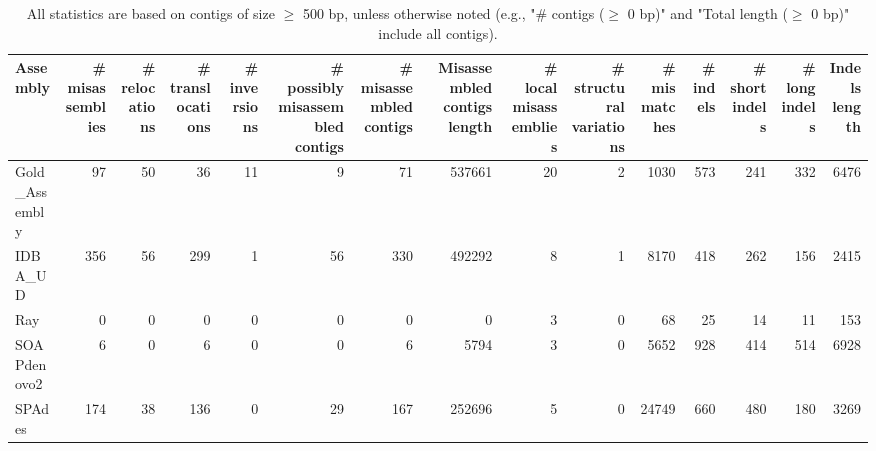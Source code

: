 \documentclass[12pt,a4paper]{article}
\begin{document}
\begin{table}[ht]
\begin{center}
\caption{All statistics are based on contigs of size $\geq$ 500 bp, unless otherwise noted (e.g., "\# contigs ($\geq$ 0 bp)" and "Total length ($\geq$ 0 bp)" include all contigs).}
\begin{tabular}{|l*{14}{|r}|}
\hline
Assembly & \# misassemblies &     \# relocations &     \# translocations &     \# inversions & \# possibly misassembled contigs & \# misassembled contigs & Misassembled contigs length & \# local misassemblies & \# structural variations & \# mismatches & \# indels &     \# short indels &     \# long indels & Indels length \\ \hline
Gold\_Assembly & 97 & 50 & 36 & 11 & 9 & 71 & 537661 & 20 & 2 & 1030 & 573 & 241 & 332 & 6476 \\ \hline
IDBA\_UD & 356 & 56 & 299 & 1 & 56 & 330 & 492292 & 8 & 1 & 8170 & 418 & 262 & 156 & 2415 \\ \hline
Ray & 0 & 0 & 0 & 0 & 0 & 0 & 0 & 3 & 0 & 68 & 25 & 14 & 11 & 153 \\ \hline
SOAPdenovo2 & 6 & 0 & 6 & 0 & 0 & 6 & 5794 & 3 & 0 & 5652 & 928 & 414 & 514 & 6928 \\ \hline
SPAdes & 174 & 38 & 136 & 0 & 29 & 167 & 252696 & 5 & 0 & 24749 & 660 & 480 & 180 & 3269 \\ \hline
\end{tabular}
\end{center}
\end{table}
\end{document}

